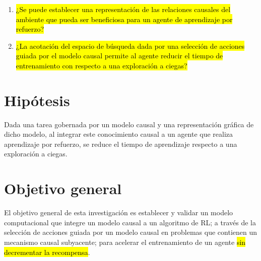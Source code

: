 \begin{enumerate}
\item \hl{¿Se puede establecer una representación de las relaciones causales
del ambiente que pueda ser beneficiosa para un agente
de aprendizaje por refuerzo?}
    
    \item \hl{¿La acotación del espacio de búsqueda dada por una selección de acciones guiada por el modelo causal permite al agente reducir el tiempo de entrenamiento con respecto a una exploración a ciegas?}
\end{enumerate}
\section{Hipótesis}



Dada una tarea gobernada por un modelo causal y una representación
gráfica de dicho modelo, al integrar este conocimiento causal
a un agente que realiza aprendizaje por refuerzo, se reduce
el tiempo de aprendizaje respecto a una exploración a ciegas.



\section{Objetivo general}
El objetivo general de esta investigación
es establecer y validar un modelo computacional que integre 
un modelo causal a un algoritmo de RL; a través de
la selección de acciones guiada por un 
modelo causal en problemas que contienen
un mecanismo causal subyacente; para acelerar el entrenamiento de un agente \hl{sin decrementar la recompensa}.
